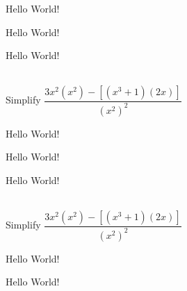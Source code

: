 \documentclass[Main.tex]{subfiles}
\begin{document}
	\begin{theorem}
		Hello World!
	\end{theorem}
	
	\begin{arule}
		Hello World!
	\end{arule}
	
	\begin{aidentity}
		Hello World!
	\end{aidentity}
	
	\begin{exercise} \hfill \\
		
Simplify $\dfrac{3x^2 \left(x^2 \right)-\left[(x^3+1)(2x)\right]}{\left(x^2\right)^2}$
	\end{exercise}
	
	\begin{definition}
		Hello World!
	\end{definition}
	
	\begin{property}
		Hello World!
	\end{property}
	
	\begin{notations}
		Hello World!
	\end{notations}
	
	\begin{example} \hfill \\
		
Simplify $\dfrac{3x^2 \left(x^2 \right)-\left[(x^3+1)(2x)\right]}{\left(x^2\right)^2}$
	\end{example}
	
	\begin{essentialq}
		Hello World!
	\end{essentialq}
	
	\begin{corollary}
		Hello World!
	\end{corollary}
\end{document}
